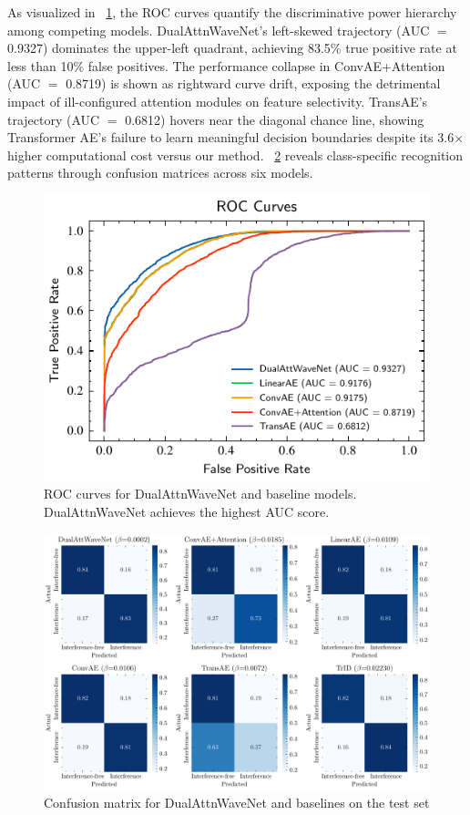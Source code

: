 \documentclass[conference]{IEEEtran}
\begin{document}
As visualized in \figurename~\ref{fig:roc_comparison}, the ROC curves quantify the discriminative power hierarchy among competing models. DualAttnWaveNet's left-skewed trajectory (AUC $=$ 0.9327) dominates the upper-left quadrant, achieving 83.5\% true positive rate at less than 10\% false positives. The performance collapse in ConvAE+Attention (AUC $=$ 0.8719) is shown as rightward curve drift, exposing the detrimental impact of ill-configured attention modules on feature selectivity. TransAE's trajectory (AUC $=$ 0.6812) hovers near the diagonal chance line, showing Transformer AE's failure to learn meaningful decision boundaries despite its 3.6× higher computational cost versus our method. \figurename~\ref{fig:confusion_matrix} reveals class-specific recognition patterns through confusion matrices across six models.

\begin{figure}[t]
    \centering
    \includegraphics[width=\linewidth]{roc-comparison.pdf}
    \caption{ROC curves for DualAttnWaveNet and baseline models. DualAttnWaveNet achieves the highest AUC score.}
    \label{fig:roc_comparison}
\end{figure}

\begin{figure}[tb]
    \centering
    \includegraphics[width=\linewidth]{confusion.pdf}
    \caption{Confusion matrix for DualAttnWaveNet and baselines on the test set}
    \label{fig:confusion_matrix}
\end{figure}
\end{document}
